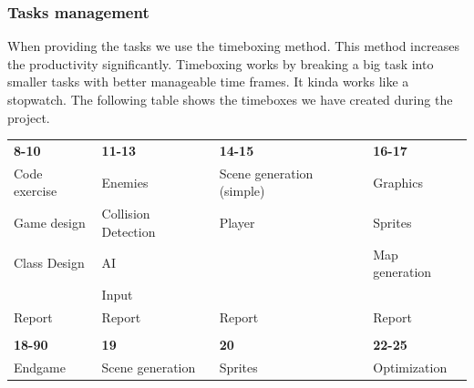 \subsubsection{Tasks management}%
When providing the tasks we use the timeboxing method.
This method increases the productivity significantly.
Timeboxing works by breaking a big task into smaller tasks with better manageable time frames.
It kinda works like a stopwatch. The following table shows the timeboxes we have
created during the project.


\begin{table}[h]
\begin{tabular}{llll}
\rowcolor[HTML]{BBDAFF} 
{\color[HTML]{000000} \textbf{8-10}} & {\color[HTML]{000000} \textbf{11-13}} & {\color[HTML]{000000} \textbf{14-15}} & {\color[HTML]{000000} \textbf{16-17}} \\
Code exercise                        & Enemies                               & Scene generation (simple)             & Graphics                              \\
Game design                          & Collision Detection                   & Player                                & Sprites                               \\
Class Design                         & AI                                    &                                       & Map generation                        \\
                                     & Input                                 &                                       &                                       \\
Report                               & Report                                & Report                                & Report                                \\
                                     &                                       &                                       &                                       \\
\rowcolor[HTML]{BBDAFF} 
\textbf{18-90}                       & \textbf{19}                           & \textbf{20}                           & \textbf{22-25}                        \\
Endgame                              & Scene generation                      & Sprites                               & Optimization                          \\

\end{tabular}
\end{table}
